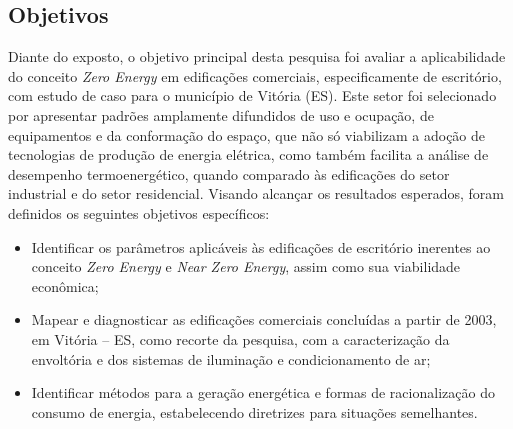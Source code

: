 \subsection{Objetivos}
\begin{onehalfspace}
\noindent Diante do exposto, o objetivo principal desta pesquisa foi avaliar a aplicabilidade do conceito \textit{Zero Energy} em edificações comerciais, especificamente de escritório, com estudo de caso para o município de Vitória (ES). Este setor foi selecionado por apresentar padrões amplamente difundidos de uso e ocupação, de equipamentos e da conformação do espaço, que não só viabilizam a adoção de tecnologias de produção de energia elétrica, como também facilita a análise de desempenho termoenergético, quando comparado às edificações do setor industrial e do setor residencial.\newline
\noindent Visando alcançar os resultados esperados, foram definidos os seguintes objetivos específicos:
\begin{itemize}
    \item Identificar os parâmetros aplicáveis às edificações de escritório inerentes ao conceito \textit{Zero Energy} e \textit{Near Zero Energy}, assim como sua viabilidade econômica;
    \item Mapear e diagnosticar as edificações comerciais concluídas a partir de 2003, em Vitória – ES, como recorte da pesquisa, com a caracterização da envoltória e dos  sistemas de iluminação e condicionamento de ar;
    \item Identificar métodos para a geração energética e formas de racionalização do consumo de energia, estabelecendo diretrizes para situações semelhantes.
\end{itemize}
\end{onehalfspace}\vspace{-0.25cm}